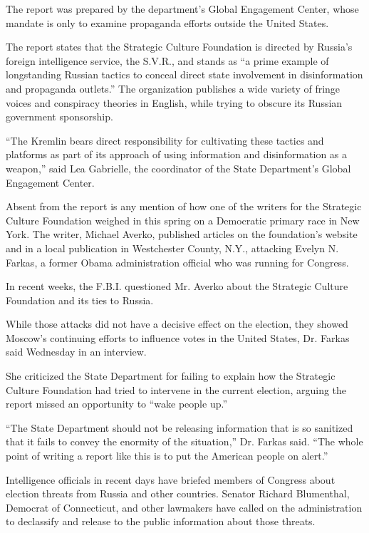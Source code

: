 The report was prepared by the department's Global Engagement Center,
whose mandate is only to examine propaganda efforts outside the United
States.

The report states that the Strategic Culture Foundation is directed by
Russia's foreign intelligence service, the S.V.R., and stands as ``a
prime example of longstanding Russian tactics to conceal direct state
involvement in disinformation and propaganda outlets.'' The organization
publishes a wide variety of fringe voices and conspiracy theories in
English, while trying to obscure its Russian government sponsorship.

``The Kremlin bears direct responsibility for cultivating these tactics
and platforms as part of its approach of using information and
disinformation as a weapon,'' said Lea Gabrielle, the coordinator of the
State Department's Global Engagement Center.

Absent from the report is any mention of how one of the writers for the
Strategic Culture Foundation weighed in this spring on a Democratic
primary race in New York. The writer, Michael Averko, published articles
on the foundation's website and in a local publication in Westchester
County, N.Y., attacking Evelyn N. Farkas, a former Obama administration
official who was running for Congress.

In recent weeks, the F.B.I. questioned Mr. Averko about the Strategic
Culture Foundation and its ties to Russia.

While those attacks did not have a decisive effect on the election, they
showed Moscow's continuing efforts to influence votes in the United
States, Dr. Farkas said Wednesday in an interview.

She criticized the State Department for failing to explain how the
Strategic Culture Foundation had tried to intervene in the current
election, arguing the report missed an opportunity to ``wake people
up.''

``The State Department should not be releasing information that is so
sanitized that it fails to convey the enormity of the situation,'' Dr.
Farkas said. ``The whole point of writing a report like this is to put
the American people on alert.''

Intelligence officials in recent days have briefed members of Congress
about election threats from Russia and other countries. Senator Richard
Blumenthal, Democrat of Connecticut, and other lawmakers have called on
the administration to declassify and release to the public information
about those threats.

